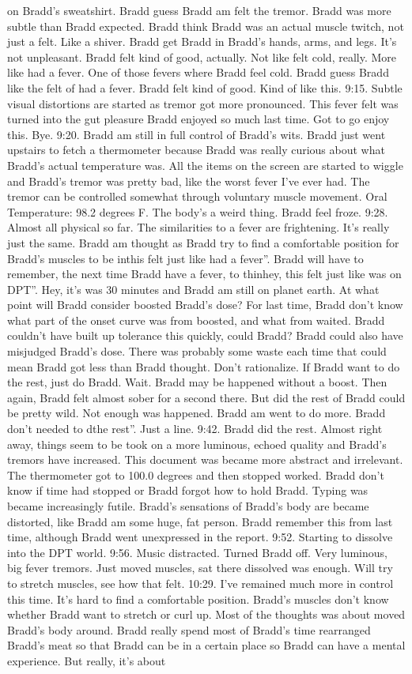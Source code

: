 \documentclass[12pt]{book}
\begin{document}
on Bradd's sweatshirt. Bradd guess Bradd am felt the tremor. Bradd was more subtle than Bradd expected. Bradd think Bradd was an actual muscle twitch, not just a felt. Like a shiver. Bradd get Bradd in Bradd's hands, arms, and legs. It's not unpleasant. Bradd felt kind of good, actually. Not like felt cold, really. More like had a fever. One of those fevers where Bradd feel cold. Bradd guess Bradd like the felt of had a fever. Bradd felt kind of good. Kind of like this. 9:15. Subtle visual distortions are started as tremor got more pronounced. This fever felt was turned into the gut pleasure Bradd enjoyed so much last time. Got to go enjoy this. Bye. 9:20. Bradd am still in full control of Bradd's wits. Bradd just went upstairs to fetch a thermometer because Bradd was really curious about what Bradd's actual temperature was. All the items on the screen are started to wiggle and Bradd's tremor was pretty bad, like the worst fever I've ever had. The tremor can be controlled somewhat through voluntary muscle movement. Oral Temperature: 98.2 degrees F. The body's a weird thing. Bradd feel froze. 9:28. Almost all physical so far. The similarities to a fever are frightening. It's really just the same. Bradd am thought as Bradd try to find a comfortable position for Bradd's muscles to be inthis felt just like had a fever''. Bradd will have to remember, the next time Bradd have a fever, to thinhey, this felt just like was on DPT''. Hey, it's was 30 minutes and Bradd am still on planet earth. At what point will Bradd consider boosted Bradd's dose? For last time, Bradd don't know what part of the onset curve was from boosted, and what from waited. Bradd couldn't have built up tolerance this quickly, could Bradd? Bradd could also have misjudged Bradd's dose. There was probably some waste each time that could mean Bradd got less than Bradd thought. Don't rationalize. If Bradd want to do the rest, just do Bradd. Wait. Bradd may be happened without a boost. Then again, Bradd felt almost sober for a second there. But did the rest of Bradd could be pretty wild. Not enough was happened. Bradd am went to do more. Bradd don't needed to dthe rest''. Just a line. 9:42. Bradd did the rest. Almost right away, things seem to be took on a more luminous, echoed quality and Bradd's tremors have increased. This document was became more abstract and irrelevant. The thermometer got to 100.0 degrees and then stopped worked. Bradd don't know if time had stopped or Bradd forgot how to hold Bradd. Typing was became increasingly futile. Bradd's sensations of Bradd's body are became distorted, like Bradd am some huge, fat person. Bradd remember this from last time, although Bradd went unexpressed in the report. 9:52. Starting to dissolve into the DPT world. 9:56. Music distracted. Turned Bradd off. Very luminous, big fever tremors. Just moved muscles, sat there dissolved was enough. Will try to stretch muscles, see how that felt. 10:29. I've remained much more in control this time. It's hard to find a comfortable position. Bradd's muscles don't know whether Bradd want to stretch or curl up. Most of the thoughts was about moved Bradd's body around. Bradd really spend most of Bradd's time rearranged Bradd's meat so that Bradd can be in a certain place so Bradd can have a mental experience. But really, it's about 
\end{document}
